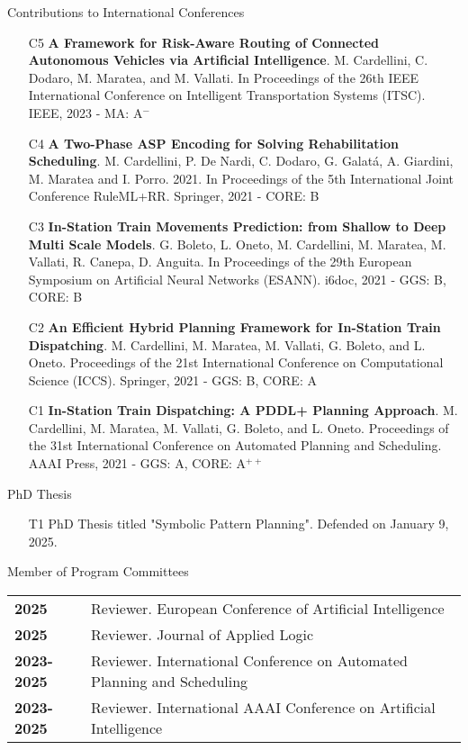 \documentclass{resume} %
\begin{document}
\begin{rSection}{Contributions to International Conferences}
\begin{enumerate}[leftmargin=5mm]
	\item[C5] \textbf{A Framework for Risk-Aware Routing of Connected Autonomous Vehicles via Artificial Intelligence}. M. Cardellini, C. Dodaro, M. Maratea, and M. Vallati. In Proceedings of the 26th IEEE International Conference on Intelligent Transportation Systems (ITSC). IEEE, 2023 - MA: A$^-$
	
	\item[C4] \textbf{A Two-Phase ASP Encoding for Solving Rehabilitation Scheduling}. M. Cardellini, P. De Nardi, C. Dodaro, G. Galat\'a, A. Giardini, M. Maratea and I. Porro. 2021. In Proceedings of the 5th International Joint Conference RuleML+RR. Springer, 2021 - CORE: B
	
	
	\item[C3] \textbf{In-Station Train Movements Prediction: from Shallow to Deep Multi Scale Models}. G. Boleto, L. Oneto, M. Cardellini, M. Maratea, M. Vallati, R. Canepa, D. Anguita. In Proceedings of the 29th European Symposium on Artificial Neural Networks (ESANN). i6doc, 2021 - GGS: B, CORE: B
	
	\item[C2] \textbf{An Efficient Hybrid Planning Framework for In-Station Train Dispatching}. M. Cardellini, M. Maratea, M. Vallati, G. Boleto, and L. Oneto. Proceedings of the 21st International Conference on Computational Science (ICCS). Springer, 2021 - GGS: B, CORE: A
	
	\item[C1] \textbf{In-Station Train Dispatching: A PDDL+ Planning Approach}. M. Cardellini, M. Maratea, M. Vallati, G. Boleto, and L. Oneto. Proceedings of the 31st International Conference on Automated Planning and Scheduling. AAAI Press, 2021 - GGS: A, CORE: A$^{++}$
\end{enumerate}
\end{rSection}

 \begin{rSection}{PhD Thesis}
  \begin{enumerate}[leftmargin=5mm]
	\item[T1] PhD Thesis titled "Symbolic Pattern Planning". Defended on January 9, 2025.	
	\end{enumerate}
 \end{rSection}
 
 
  \begin{rSection}{Member of Program Committees}
	\begin{tabularx}{0.95\textwidth} {lp{14cm}}
 \textbf{2025} & Reviewer. European Conference of Artificial Intelligence \\
 \textbf{2025} & Reviewer. Journal of Applied Logic \\
 \textbf{2023-2025} & Reviewer. International Conference on Automated Planning and Scheduling \\
 \textbf{2023-2025} & Reviewer. International AAAI Conference on Artificial Intelligence 
  \end{tabularx}
 \end{rSection}
 
\end{document}

